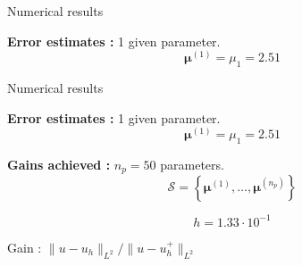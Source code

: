 \begin{frame}{Numerical results}
	\hspace{-5pt}\begin{minipage}[t]{0.46\linewidth}
		\textbf{Error estimates :} 1 given parameter.
		$$\bm{\mu}^{(1)}=\mu_1=2.51 $$
		\vspace{-35pt}
		\begin{figure}[H]
		\end{figure}
	\end{minipage} \qquad \small
	\begin{minipage}[t]{0.48\linewidth}
	\end{minipage}
\end{frame}

\begin{frame}[noframenumbering]{Numerical results}
	\hspace{-5pt}\begin{minipage}[t]{0.46\linewidth}
		\textbf{Error estimates :} 1 given parameter.
		$$\bm{\mu}^{(1)}=\mu_1=2.51 $$
		\vspace{-35pt}
		\begin{figure}[H]
		\end{figure}
	\end{minipage} \qquad \small
	\begin{minipage}[t]{0.48\linewidth}
		\textbf{Gains achieved :} $n_p=50$ parameters.
		$$\mathcal{S}=\left\{\bm{\mu}^{(1)},\dots,\bm{\mu}^{(n_p)}\right\}$$
		\vspace{-15pt}
		\begin{table}[H]
		\end{table}

		\normalsize\centering\vspace{-20pt}
		$$h=1.33\cdot 10^{-1}$$

		\vspace{-5pt}
		Gain : $\| u-u_h\|_{L^2} / \| u-u_h^+\|_{L^2}$ \\
		\end{minipage}
\end{frame}
